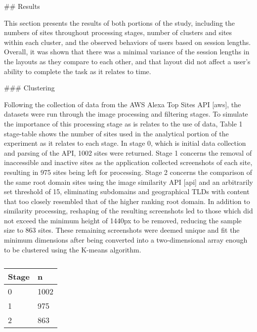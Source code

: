 ## Results

This section presents the results of both portions of the study, including the numbers of sites throughout processing stages, number of clusters and sites within each cluster, and the observed behaviors of users based on session lengths. Overall, it was shown that there was a minimal variance of the session lengths in the layouts as they compare to each other, and that layout did not affect a user's ability to complete the task as it relates to time.

### Clustering

Following the collection of data from the AWS Alexa Top Sites API [aws], the datasets were run through the image processing and filtering stages. To simulate the importance of this processing stage as is relates to the use of data, Table 1 {stage-table} shows the number of sites used in the analytical portion of the experiment as it relates to each stage. In stage 0, which is initial data collection and parsing of the API, 1002 sites were returned. Stage 1 concerns the removal of inaccessible and inactive sites as the application collected screenshots of each site, resulting in 975 sites being left for processing. Stage 2 concerns the comparison of the same root domain sites using the image similarity API [api] and an arbitrarily set threshold of 15, eliminating subdomains and geographical TLDs with content that too closely resembled that of the higher ranking root domain. In addition to similarity processing, reshaping of the resulting screenshots led to those which did not exceed the minimum height of 1440px to be removed, reducing the sample size to 863  sites. These remaining screenshots were deemed unique and fit the minimum dimensions after being converted into a two-dimensional array enough to be clustered using the K-means algorithm.

\begin{table}[]
\caption{}
\label{tab:stage-table}
\begin{tabular}{@{}ll@{}}
\toprule
Stage & n    \\ \midrule
0     & 1002 \\
1     & 975  \\
2     & 863  \\ \bottomrule
\end{tabular}
\end{table}

